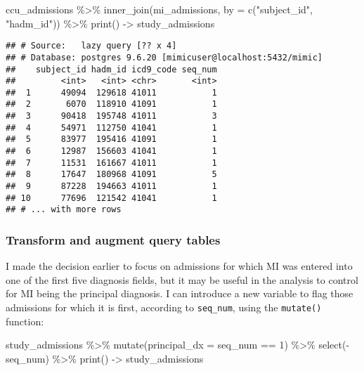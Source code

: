 \documentclass[
]{article}
\newenvironment{Shaded}{\begin{snugshade}}{\end{snugshade}}
\newcommand{\AttributeTok}[1]{\textcolor[rgb]{0.77,0.63,0.00}{#1}}
\newcommand{\DecValTok}[1]{\textcolor[rgb]{0.00,0.00,0.81}{#1}}
\newcommand{\FunctionTok}[1]{\textcolor[rgb]{0.00,0.00,0.00}{#1}}
\newcommand{\NormalTok}[1]{#1}
\newcommand{\OtherTok}[1]{\textcolor[rgb]{0.56,0.35,0.01}{#1}}
\newcommand{\SpecialCharTok}[1]{\textcolor[rgb]{0.00,0.00,0.00}{#1}}
\newcommand{\StringTok}[1]{\textcolor[rgb]{0.31,0.60,0.02}{#1}}
\begin{document}
\begin{Shaded}
\begin{Highlighting}[]
\NormalTok{ccu\_admissions }\SpecialCharTok{\%\textgreater{}\%}
  \FunctionTok{inner\_join}\NormalTok{(mi\_admissions, }\AttributeTok{by =} \FunctionTok{c}\NormalTok{(}\StringTok{"subject\_id"}\NormalTok{, }\StringTok{"hadm\_id"}\NormalTok{)) }\SpecialCharTok{\%\textgreater{}\%}
  \FunctionTok{print}\NormalTok{() }\OtherTok{{-}\textgreater{}}\NormalTok{ study\_admissions}
\end{Highlighting}
\end{Shaded}

\begin{verbatim}
## # Source:   lazy query [?? x 4]
## # Database: postgres 9.6.20 [mimicuser@localhost:5432/mimic]
##    subject_id hadm_id icd9_code seq_num
##         <int>   <int> <chr>       <int>
##  1      49094  129618 41011           1
##  2       6070  118910 41091           1
##  3      90418  195748 41011           3
##  4      54971  112750 41041           1
##  5      83977  195416 41091           1
##  6      12987  156603 41041           1
##  7      11531  161667 41011           1
##  8      17647  180968 41091           5
##  9      87228  194663 41011           1
## 10      77696  121542 41041           1
## # ... with more rows
\end{verbatim}

\hypertarget{transform-and-augment-query-tables}{%
\subsubsection{Transform and augment query
tables}\label{transform-and-augment-query-tables}}

I made the decision earlier to focus on admissions for which MI was
entered into one of the first five diagnosis fields, but it may be
useful in the analysis to control for MI being the principal diagnosis.
I can introduce a new variable to flag those admissions for which it is
first, according to \texttt{seq\_num}, using the \texttt{mutate()}
function:

\begin{Shaded}
\begin{Highlighting}[]
\NormalTok{study\_admissions }\SpecialCharTok{\%\textgreater{}\%}
  \FunctionTok{mutate}\NormalTok{(}\AttributeTok{principal\_dx =}\NormalTok{ seq\_num }\SpecialCharTok{==} \DecValTok{1}\NormalTok{) }\SpecialCharTok{\%\textgreater{}\%}
  \FunctionTok{select}\NormalTok{(}\SpecialCharTok{{-}}\NormalTok{seq\_num) }\SpecialCharTok{\%\textgreater{}\%}
  \FunctionTok{print}\NormalTok{() }\OtherTok{{-}\textgreater{}}\NormalTok{ study\_admissions}
\end{Highlighting}
\end{Shaded}
\end{document}
